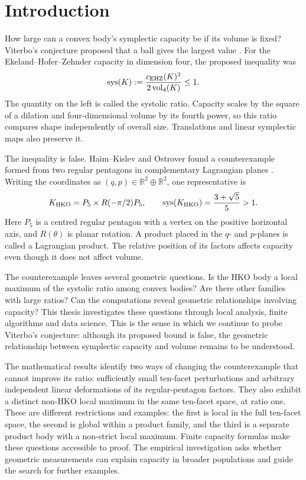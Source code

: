 \section{Introduction}\label{sec:introduction}

How large can a convex body's symplectic capacity be if its volume is fixed?
Viterbo's conjecture proposed that a ball gives the largest value
\cite{Viterbo2000}. For the Ekeland--Hofer--Zehnder capacity in dimension
four, the proposed inequality was
\[
 \operatorname{sys}(K):=\frac{c_{\rm EHZ}(K)^2}{2\operatorname{vol}_4(K)}\leq1.
\]
The quantity on the left is called the systolic ratio. Capacity scales by
the square of a dilation and four-dimensional volume by its fourth power,
so this ratio compares shape independently of overall size. Translations
and linear symplectic maps also preserve it.

The inequality is false. Haim--Kislev and Ostrover found a counterexample
formed from two regular pentagons in complementary Lagrangian planes
\cite{HaimKislevOstrover2024}. Writing the coordinates as $(q,p)\in
\mathbb R^2\oplus\mathbb R^2$, one representative is
\[
 K_{\rm HKO}=P_5\times R(-\pi/2)P_5,\qquad
 \operatorname{sys}(K_{\rm HKO})=\frac{3+\sqrt5}{5}>1.
\]
Here $P_5$ is a centred regular pentagon with a vertex on the positive
horizontal axis, and $R(\theta)$ is planar rotation. A product placed in
the $q$- and $p$-planes is called a Lagrangian product. The relative
position of its factors affects capacity even though it does not affect
volume.

The counterexample leaves several geometric questions. Is the HKO body a
local maximum of the systolic ratio among convex bodies? Are there other
families with large ratios? Can the
computations reveal geometric relationships involving capacity? This thesis
investigates these questions through local analysis, finite algorithms and
data science. This is the sense in which we continue to probe Viterbo's
conjecture: although its proposed bound is false, the geometric relationship
between symplectic capacity and volume remains to be understood.

The mathematical results identify two ways of changing the counterexample
that cannot improve its ratio: sufficiently small ten-facet perturbations
and arbitrary independent linear deformations of its regular-pentagon
factors. They also exhibit a distinct non-HKO local maximum in the same
ten-facet space, at ratio one. These are different restrictions and examples:
the first is local in the full ten-facet space, the second is global within a
product family, and the third is a separate product body with a non-strict
local maximum. Finite capacity formulas make these questions accessible to
proof. The empirical investigation asks whether geometric measurements can
explain capacity in broader populations and guide the search for further
examples.

